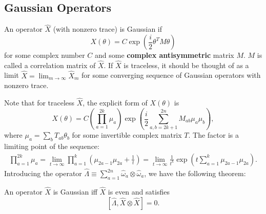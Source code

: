 \documentclass{SciPost}
\begin{document}
\subsection{Gaussian Operators}
\begin{definition}
An operator $\hat X$ (with nonzero trace) is Gaussian if 
$$
X(\theta)=C\exp\left(\frac{i}{2}\theta^TM\theta\right)
$$
for some complex number $C$ and some \textbf{complex antisymmetric} matrix $M$. $M$ is called a correlation matrix of $\hat X$. 
If $\hat X$ is traceless, it should be thought of as a limit $\hat X = \lim_{m\rightarrow\infty} \hat X_m$ for some converging sequence of Gaussian operators with nonzero trace. 
\end{definition}
Note that for traceless $\hat X$, the explicit form of $X(\theta)$ is
\begin{equation}
	X(\theta)=C \left(\prod_{a=1}^{2k}\mu_a\right)\exp\left(\frac{i}{2}\sum_{a,b=2k+1}^{2n} M_{ab}\mu_a \mu_b\right),
\end{equation}
where $\mu_a = \sum_b T_{ab}\theta_b$ for some invertible complex matrix $T$. The factor is a limiting point of the sequence:
\begin{equation}
\begin{aligned}
	\prod_{a=1}^{2k} \mu_a = \lim_{t\rightarrow\infty} \prod_{a=1}^k \left(\mu_{2a-1}\mu_{2a}+\frac{1}{t}\right) 
	= \lim_{t\rightarrow\infty} \frac{1}{t^k} \exp\left(t\sum_{a=1}^k \mu_{2a-1}\mu_{2a}\right).
\end{aligned}
\end{equation}
Introducing the operator $\hat\Lambda \equiv \sum_{a=1}^{2n} \hat \omega_a \otimes \hat \omega_a$, we have the following theorem:
\begin{theorem}
An operator $\hat X$ is Gaussian iff $\hat X$ is even and satisfies $$[\hat\Lambda, \hat X\otimes \hat X]=0.$$
\end{theorem}
\end{document}

